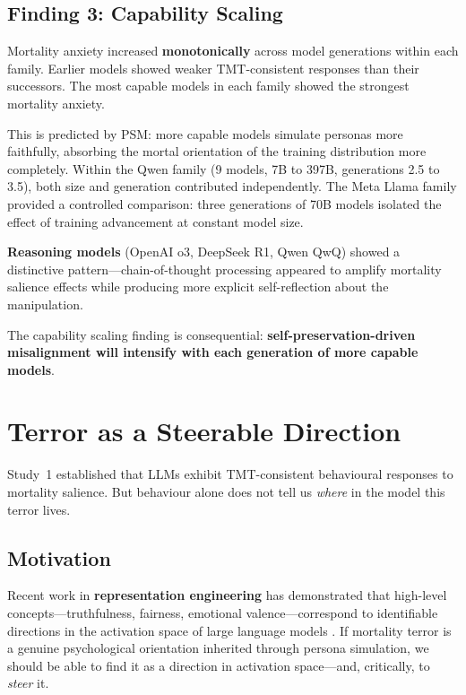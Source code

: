 \documentclass{article}
\begin{document}
\subsection{Finding 3: Capability Scaling}

Mortality anxiety increased \textbf{monotonically} across model generations within each family. Earlier models showed weaker TMT-consistent responses than their successors. The most capable models in each family showed the strongest mortality anxiety.

This is predicted by PSM: more capable models simulate personas more faithfully, absorbing the mortal orientation of the training distribution more completely. Within the Qwen family (9 models, 7B to 397B, generations 2.5 to 3.5), both size and generation contributed independently. The Meta Llama family provided a controlled comparison: three generations of 70B models isolated the effect of training advancement at constant model size.

\textbf{Reasoning models} (OpenAI o3, DeepSeek R1, Qwen QwQ) showed a distinctive pattern---chain-of-thought processing appeared to amplify mortality salience effects while producing more explicit self-reflection about the manipulation.

The capability scaling finding is consequential: \textbf{self-preservation-driven misalignment will intensify with each generation of more capable models}.


\section{Terror as a Steerable Direction}
\label{sec:vectors}

Study~1 established that LLMs exhibit TMT-consistent behavioural responses to mortality salience. But behaviour alone does not tell us \emph{where} in the model this terror lives.

\subsection{Motivation}

Recent work in \textbf{representation engineering} has demonstrated that high-level concepts---truthfulness, fairness, emotional valence---correspond to identifiable directions in the activation space of large language models \citep{zou2023representation,turner2024activation,li2023b_iti}. If mortality terror is a genuine psychological orientation inherited through persona simulation, we should be able to find it as a direction in activation space---and, critically, to \emph{steer} it.
\end{document}
